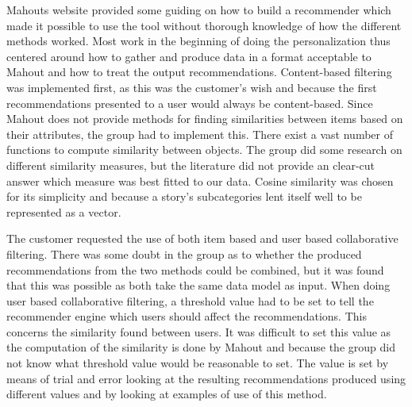 Mahouts website provided some guiding on how to build a recommender which made it possible to use the tool without thorough knowledge of how the different methods worked. Most work in the beginning of doing the personalization thus centered around how to gather and produce data in a format acceptable to Mahout and how to treat the output recommendations. Content-based filtering was implemented first, as this was the customer's wish and because the first recommendations presented to a user would always be content-based. Since Mahout does not provide methods for finding similarities between items based on their attributes, the group had to implement this. There exist a vast number of functions to compute similarity between objects. The group did some research on different similarity measures, but the literature did not provide an clear-cut answer which measure was best fitted to our data. Cosine similarity was chosen for its simplicity and because a story's subcategories lent itself well to be represented as a vector.\newline

The customer requested the use of both item based and user based collaborative filtering. There was some doubt in the group as to whether the produced recommendations from the two methods could be combined, but it was found that this was possible as both take the same data model as input.
When doing user based collaborative filtering, a threshold value had to be set to tell the recommender engine which users should affect the recommendations. This concerns the similarity found between users. It was difficult to set this value as the computation of the similarity is done by Mahout and because the group did not know what threshold value would be reasonable to set. The value is set by means of trial and error looking at the resulting recommendations produced using different values and by looking at examples of use of this method. 


\cleardoublepage